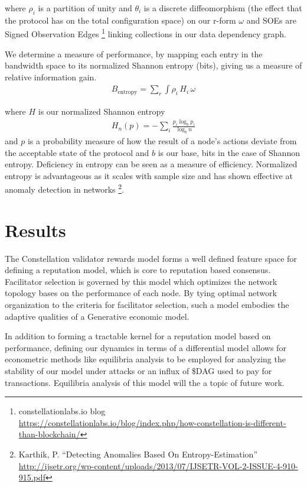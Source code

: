 \documentclass{article}
\begin{document}
where $\rho_i$ is a partition of unity and $\theta_i$ is a discrete diffeomorphism (the effect that the protocol has on the total configuration space) on our r-form $\omega$ and SOEs are Signed Observation Edges
\footnote{constellationlabs.io blog\\ \url{https://constellationlabs.io/blog/index.php/how-constellation-is-different-than-blockchain/}} 
linking collections in our data dependency graph.

We determine a measure of performance, by mapping each entry in the bandwidth space to its normalized Shannon entropy (bits), giving us a measure of relative information gain.
\begin{equation*} \label{eq1}
\begin{split}
B_\mathrm{entropy} = \sum_{r} \int \rho_i\, H_i\, \omega 
\end{split}
\end{equation*}

where $H$ is our normalized Shannon entropy
\begin{equation*} \label{eq1}
\begin{split}
H_n(p) = - \sum_i \frac{p_i \log_b p_i}{\log_b n}
\end{split}
\end{equation*}
and $p$ is a probability measure of how the result of a node's actions deviate from the acceptable state of the protocol and $b$ is our base, bits in the case of Shannon entropy. Deficiency in entropy can be seen as a measure of efficiency. Normalized entropy is advantageous as it scales with sample size and has shown effective at anomaly detection in networks
\footnote{Karthik, P. ``Detecting Anomalies Based On Entropy-Estimation''\\ \url{http://ijsetr.org/wp-content/uploads/2013/07/IJSETR-VOL-2-ISSUE-4-910-915.pdf}}.

\section{Results}
The Constellation validator rewards model forms a well defined feature space for defining a reputation model, which is core to reputation based consensus. Facilitator selection is governed by this model which optimizes the network topology bases on the performance of each node. By tying optimal network organization to the criteria for facilitator selection, such a model embodies the adaptive qualities of a Generative economic model.

In addition to forming a tractable kernel for a reputation model based on performance, defining our dynamics in terms of a differential model allows for econometric methods like equilibria analysis to be employed for analyzing the stability of our model under attacks or an influx of \$DAG used to pay for transactions. Equilibria analysis of this model will the a topic of future work.


\end{document}
